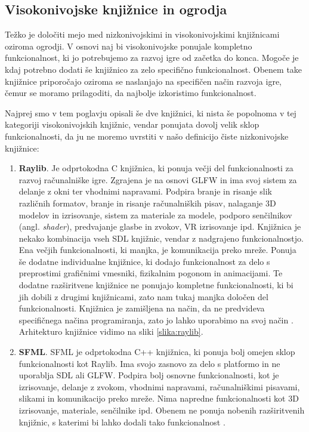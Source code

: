 \documentclass[12pt,a4paper,twoside]{book}
\begin{document}
\subsection{Visokonivojske knjižnice in ogrodja}
Težko je določiti mejo med nizkonivojskimi in visokonivojskimi knjižnicami oziroma ogrodji. V osnovi naj bi visokonivojske ponujale kompletno funkcionalnost, ki jo potrebujemo za razvoj igre od začetka do konca. Mogoče je kdaj potrebno dodati še knjižnico za zelo specifično funkcionalnost. Obenem take knjižnice priporočajo oziroma se naslanjajo na specifičen način razvoja igre, čemur se moramo prilagoditi, da najbolje izkoristimo funkcionalnost. 

Najprej smo v tem poglavju opisali še dve knjižnici, ki nista še popolnoma v tej kategoriji visokonivojskih knjižnic, vendar ponujata dovolj velik sklop funkcionalnosti, da ju ne moremo uvrstiti v našo definicijo čiste nizkonivojske knjižnice:
\begin{enumerate}
	\item \textbf{Raylib}. Je odprtokodna C knjižnica, ki ponuja večji del funkcionalnosti za razvoj računalniške igre. Zgrajena je na osnovi GLFW in ima svoj sistem za delanje z okni ter vhodnimi napravami. Podpira branje in risanje slik različnih formatov, branje in risanje računalniških pisav, nalaganje 3D modelov in izrisovanje, sistem za materiale za modele, podporo senčilnikov (angl. \textit{shader}), predvajanje glasbe in zvokov, VR izrisovanje ipd. Knjižnica je nekako kombinacija vseh SDL knjižnic, vendar z nadgrajeno funkcionalnostjo. Ena večjih funkcionalnosti, ki manjka, je komunikacija preko mreže. Ponuja še dodatne individualne knjižnice, ki dodajo funkcionalnost za delo s preprostimi grafičnimi vmesniki, fizikalnim pogonom in animacijami. Te dodatne razširitvene knjižnice ne ponujajo kompletne funkcionalnosti, ki bi jih dobili z drugimi knjižnicami, zato nam tukaj manjka določen del funkcionalnosti. Knjižnica je zamišljena na način, da ne predvideva specifičnega načina programiranja, zato jo lahko uporabimo na svoj način \cite{raylib}. Arhitekturo knjižnice vidimo na sliki \ref{slika:raylib}.
	\item \textbf{SFML}. SFML je odprtokodna C++ knjižnica, ki ponuja bolj omejen sklop funkcionalnosti kot Raylib. Ima svojo zasnovo za delo s platformo in ne uporablja SDL ali GLFW. Podpira bolj osnovne funkcionalnosti, kot je izrisovanje, delanje z zvokom, vhodnimi napravami, računalniškimi pisavami, slikami in komunikacijo preko mreže. Nima napredne funkcionalnosti kot 3D izrisovanje, materiale, senčilnike ipd. Obenem ne ponuja nobenih razširitvenih knjižnic, s katerimi bi lahko dodali tako funkcionalnost \cite{sfml}. 
\end{enumerate}
\end{document}
